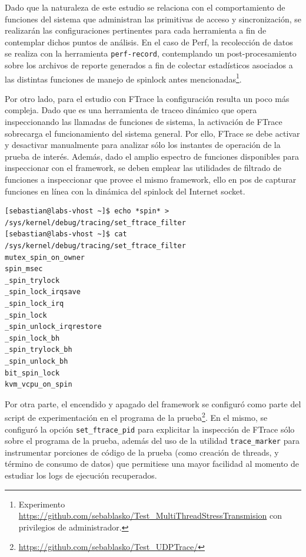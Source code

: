 Dado que la naturaleza de este estudio se relaciona con el comportamiento de funciones del sistema que administran las primitivas de acceso y sincronización, se realizarán las configuraciones pertinentes para cada herramienta a fin de contemplar dichos puntos de análisis. En el caso de Perf, la recolección de datos se realiza con la herramienta \verb=perf-record=, contemplando un post-procesamiento sobre los archivos de reporte generados a fin de colectar estadísticos asociados a las distintas funciones de manejo de spinlock antes mencionadas\footnote{Experimento \url{https://github.com/sebablasko/Test_MultiThreadStressTransmision} con privilegios de administrador.}.

Por otro lado, para el estudio con FTrace la configuración resulta un poco más compleja. Dado que es una herramienta de traceo dinámico que opera inspeccionando las llamadas de funciones de sistema, la activación de FTrace sobrecarga el funcionamiento del sistema general. Por ello, FTrace se debe activar y desactivar manualmente para analizar sólo los instantes de operación de la prueba de interés. Además, dado el amplio espectro de funciones disponibles para inspeccionar con el framework, se deben emplear las utilidades de filtrado de funciones a inspeccionar que provee el mismo framework, ello en pos de capturar funciones en línea con la dinámica del spinlock del Internet socket.

\vspace{1pc}
\begin{minipage}{\linewidth}
\begin{lstlisting}[style=BashInputStyle, label={code:ftrace}, caption={Configuración de filtros de FTrace sobre funciones a estudiar.}, captionpos=b]
[sebastian@labs-vhost ~]$ echo *spin* > /sys/kernel/debug/tracing/set_ftrace_filter 
[sebastian@labs-vhost ~]$ cat /sys/kernel/debug/tracing/set_ftrace_filter 
mutex_spin_on_owner
spin_msec
_spin_trylock
_spin_lock_irqsave
_spin_lock_irq
_spin_lock
_spin_unlock_irqrestore
_spin_lock_bh
_spin_trylock_bh
_spin_unlock_bh
bit_spin_lock
kvm_vcpu_on_spin
\end{lstlisting}
\end{minipage}

Por otra parte, el encendido y apagado del framework se configuró como parte del script de experimentación en el programa de la prueba\footnote{\url{https://github.com/sebablasko/Test_UDPTrace/}}. En el mismo, se configuró la opción \verb=set_ftrace_pid= para explicitar la inspección de FTrace sólo sobre el programa de la prueba, además del uso de la utilidad \verb=trace_marker= para instrumentar porciones de código de la prueba (como creación de threads, y término de consumo de datos) que permitiese una mayor facilidad al momento de estudiar los logs de ejecución recuperados.


